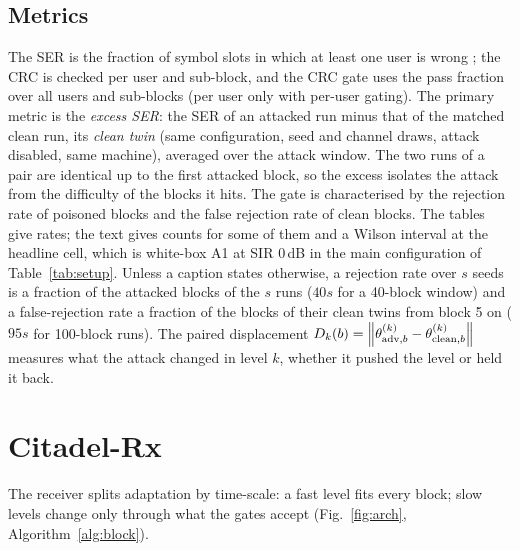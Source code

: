 \documentclass[journal]{IEEEtran}
\theoremstyle{remark}
\newcommand{\norm}[1]{\left\lVert #1 \right\rVert}
\begin{document}
\subsection{Metrics}
The SER is the fraction of symbol slots in which at least one user is wrong
\cite{shlezinger2021,raviv2023,wu2024}; the CRC is checked per user and sub-block, and the CRC gate
uses the pass fraction over all users and sub-blocks (per user only with per-user gating). The primary metric is the \emph{excess SER}: the SER of an
attacked run minus that of the matched clean run, its \emph{clean twin} (same configuration, seed and channel draws,
attack disabled, same machine), averaged over the attack window. The two runs of a pair are identical
up to the first attacked block, so the excess isolates the attack from the difficulty of the
blocks it hits. The gate is characterised by the rejection rate of poisoned blocks and the false
rejection rate of clean blocks. The tables give rates; the text gives counts for some of them and a Wilson interval \cite{wilson1927} at the headline cell, which is white-box A1 at SIR 0\,dB in the main configuration of Table~\ref{tab:setup}. Unless a caption states otherwise, a rejection rate over $s$ seeds is a fraction of the attacked blocks of the $s$ runs ($40s$ for a 40-block window) and a false-rejection rate a fraction of the blocks of their clean twins from block 5 on ($95s$ for 100-block runs). The
paired displacement $D_k(b)=\norm{\theta^{(k)}_{{\rm adv},b}-\theta^{(k)}_{{\rm clean},b}}$ measures what the attack
changed in level $k$, whether it pushed the level or held it back.

\section{Citadel-Rx}\label{sec:citadel}
The receiver splits adaptation by time-scale: a fast level fits every block; slow levels change
only through what the gates accept (Fig.~\ref{fig:arch}, Algorithm~\ref{alg:block}).
\end{document}
